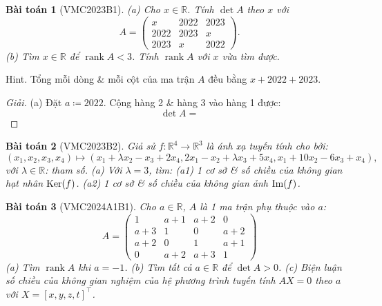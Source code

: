 \documentclass{article}
\newtheorem{baitoan}{Bài toán}
\begin{document}
\begin{baitoan}[VMC2023B1]
	(a) Cho $x\in\mathbb{R}$. Tính $\det A$ theo $x$ với
	\begin{equation*}
		A = \begin{pmatrix}
			x & 2022 & 2023\\2022 & 2023 & x\\2023 & x & 2022
		\end{pmatrix}.
	\end{equation*}
	(b) Tìm $x\in\mathbb{R}$ để $\operatorname{rank}A < 3$. Tính $\operatorname{rank}A$ với $x$ vừa tìm được.
\end{baitoan}
{\sf Hint.} Tổng mỗi dòng \& mỗi cột của ma trận $A$ đều bằng $x + 2022 + 2023$.

\begin{proof}[Giải]
	(a) Đặt $a\coloneqq2022$. Cộng hàng 2 \& hàng 3 vào hàng 1 được:
	\begin{equation*}
		\det A = 
	\end{equation*}
\end{proof}

\begin{baitoan}[VMC2023B2]
	Giả sử $f:\mathbb{R}^4\to\mathbb{R}^3$ là ánh xạ tuyến tính cho bởi:
	\begin{equation*}
		(x_1,x_2,x_3,x_4)\mapsto(x_1 + \lambda x_2 - x_3 + 2x_4,2x_1 - x_2 + \lambda x_3 + 5x_4,x_1 + 10x_2 - 6x_3 + x_4),
	\end{equation*}
	với $\lambda\in\mathbb{R}$: tham số. (a) Với $\lambda = 3$, tìm: (a1) 1 cơ sở \& số chiều của không gian hạt nhân ${\rm Ker}(f)$. (a2) 1 cơ sở \& số chiều của không gian ảnh ${\rm Im}(f)$.
\end{baitoan}

\begin{baitoan}[VMC2024A1B1]
	Cho $a\in\mathbb{R}$, $A$ là 1 ma trận phụ thuộc vào $a$:
	\begin{equation}
		A = \begin{pmatrix}
			1 & a + 1 & a + 2 & 0\\a + 3 & 1 & 0 & a + 2\\a + 2 & 0 & 1 & a + 1\\0 & a + 2 & a + 3 & 1
		\end{pmatrix}
	\end{equation}
	(a) Tìm $\operatorname{rank}A$ khi $a = -1$. (b) Tìm tất cả $a\in\mathbb{R}$ để $\det A > 0$. (c) Biện luận số chiều của không gian nghiệm của hệ phương trình tuyến tính $AX = 0 $ theo $a$ với $X = [x,y,z,t]^\top$.
\end{baitoan}
\end{document}

